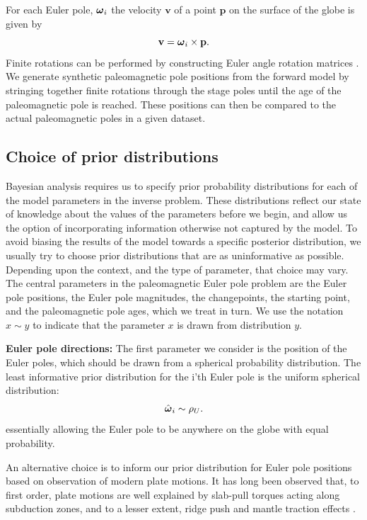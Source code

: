 \documentclass[11pt,letterpaper]{article}
\newcommand{\mitbf}[1]{\hbox{\mathversion{bold}$#1$}}
\begin{document}
For each Euler pole, $\mitbf{\omega}_i$ the velocity $\mathbf{v}$ of a point $\mathbf{p}$ on the surface of the globe is given by
\begin{equation}
\mathbf{v} = \mitbf{\omega}_i \times \mathbf{p}.
\label{eq:rigid_rotation}
\end{equation}
Finite rotations can be performed by constructing Euler angle rotation matrices \citep[cf.][]{Goldstein1965a}.  We generate synthetic paleomagnetic pole positions from the forward model by stringing together finite rotations through the stage poles until the age of the paleomagnetic pole is reached. These positions can then be compared to the actual paleomagnetic poles in a given dataset.

\subsection*{Choice of prior distributions}
\label{sec:priors}

Bayesian analysis requires us to specify prior probability distributions for each of the model parameters in the inverse problem. These distributions reflect our state of knowledge about the values of the parameters before we begin, and allow us the option of incorporating information otherwise not captured by the model. To avoid biasing the results of the model towards a specific posterior distribution, we usually try to choose prior distributions that are as uninformative as possible. Depending upon the context, and the type of parameter, that choice may vary. The central parameters in the paleomagnetic Euler pole problem are the Euler pole positions, the Euler pole magnitudes, the changepoints, the starting point, and the paleomagnetic pole ages, which we treat in turn. We use the notation $x \sim y$ to indicate that the parameter $x$ is drawn from distribution $y$.

\textbf{Euler pole directions:} 
The first parameter we consider is the position of the Euler poles, which should be drawn from a spherical probability distribution. The least informative prior distribution for the i'th Euler pole is the uniform spherical distribution:
\begin{equation}
\hat{\mitbf{\omega}}_i \sim \rho_U.
\end{equation}
essentially allowing the Euler pole to be anywhere on the globe with equal probability.

An alternative choice is to inform our prior distribution for Euler pole positions based on observation of modern plate motions. It has long been observed that, to first order, plate motions are well explained by slab-pull torques acting along subduction zones, and to a lesser extent, ridge push and mantle traction effects \citep{Forsyth1975a, Gordon1978a, Richardson1992a}. 
\end{document}
